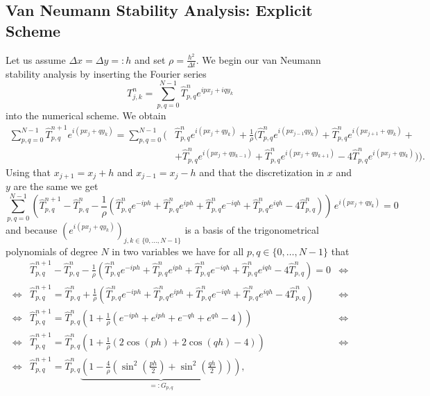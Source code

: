 \documentclass[a4aper,pagesize]{article}
\theoremstyle{definition}
\theoremstyle{plain}
\theoremstyle{remark}
\renewcommand{\hat}{\widehat}
\begin{document}
\subsection{Van Neumann Stability Analysis: Explicit Scheme}
Let us assume $\Delta x = \Delta y =: h$ and set $\rho = \frac{h^2}{\Delta t}$. We begin our van Neumann stability analysis by inserting the Fourier series
\begin{equation}
	T_{j,k}^n = \sum_{p,q = 0}^{N-1} \hat{T}^n_{p,q} e^{ipx_j + iqy_k}
\end{equation}
into the numerical scheme. We obtain
\begin{equation}
	\begin{split}
		\sum_{p,q = 0}^{N-1} \hat{T}^{n+1}_{p,q} e^{i(px_{j} + qy_{k})} =
		\sum_{p,q = 0}^{N-1} (
			&\hat{T}^{n}_{p,q} e^{i(px_{j} + qy_{k})} +
			\frac{1}{\rho} (
			  	  \hat{T}^{n}_{p,q} e^{i(px_{j-1} qy_{k})}
				+ \hat{T}^{n}_{p,q} e^{i(px_{j+1} + qy_{k})} + \\
			   &+ \hat{T}^{n}_{p,q} e^{i(px_{j} + qy_{k-1})}
				+ \hat{T}^{n}_{p,q} e^{i(px_{j} + qy_{k+1})}
				-  4 \hat{T}^{n}_{p,q} e^{i(px_{j} + qy_{k})}
			)
		).
	\end{split}
\end{equation}
Using that $x_{j+1} = {x_j} + h$ and $x_{j-1} = {x_j} - h$ and that the discretization in $x$ and $y$ are the same we get
\begin{equation}
	\sum_{p,q = 0}^{N-1}(
		  \hat{T}^{n+1}_{p,q}
		- \hat{T}^{n}_{p,q}
		-\frac{1}{\rho} (
			  \hat{T}^{n}_{p,q} e^{-iph}
			+ \hat{T}^{n}_{p,q} e^{iph}
		    + \hat{T}^{n}_{p,q} e^{-iqh}
			+ \hat{T}^{n}_{p,q} e^{iqh}
			-  4 \hat{T}^{n}_{p,q}
		)
	)\, e^{i(px_{j} + qy_{k})} = 0
\end{equation}
and because $(e^{i(px_{j} + qy_{k})})_{j,k \in \{0, ..., N-1\}}$ is a basis of the trigonometrical polynomials of degree $N$ in two variables we have for all $p,q \in \{0, \dots, N-1\}$ that
\begin{align*}
	  &\hat{T}^{n+1}_{p,q}
	- \hat{T}^{n}_{p,q}
	-\frac{1}{\rho} \left(
		  \hat{T}^{n}_{p,q} e^{-iph}
		+ \hat{T}^{n}_{p,q} e^{iph}
	    + \hat{T}^{n}_{p,q} e^{-iqh}
		+ \hat{T}^{n}_{p,q} e^{iqh}
		-  4 \hat{T}^{n}_{p,q}
	\right)= 0
&\Leftrightarrow\\
\Leftrightarrow
	  &\hat{T}^{n+1}_{p,q} =
      \hat{T}^{n}_{p,q}
	 +\frac{1}{\rho} \left(
		  \hat{T}^{n}_{p,q} e^{-iph}
		+ \hat{T}^{n}_{p,q} e^{iph}
	    + \hat{T}^{n}_{p,q} e^{-iqh}
		+ \hat{T}^{n}_{p,q} e^{iqh}
		-  4 \hat{T}^{n}_{p,q}
	\right)
&\Leftrightarrow\\
\Leftrightarrow
	  &\hat{T}^{n+1}_{p,q} =
      \hat{T}^{n}_{p,q}\left(
      1
	 +\frac{1}{\rho} \left(
		  e^{-iph}
		+ e^{iph}
	    + e^{-qh}
		+ e^{qh}
		-  4
	    \right)
	\right)
&\Leftrightarrow\\
\Leftrightarrow
	  &\hat{T}^{n+1}_{p,q} =
      \hat{T}^{n}_{p,q}\left(
      1
	 +\frac{1}{\rho} \left(
		  2\cos(ph)
	    + 2\cos(qh)
	    - 4
	    \right)
	\right)
&\Leftrightarrow\\
\Leftrightarrow
	  &\hat{T}^{n+1}_{p,q} =
      \hat{T}^{n}_{p,q}\underbrace{\left(
      1
	 -\frac{4}{\rho} \left(
	      \sin^2\left(\frac{ph}{2}\right)
	    + \sin^2\left(\frac{qh}{2}\right)
	    \right)
	  \right)}_{=:G_{p,q}},
\end{align*}
\end{document}
